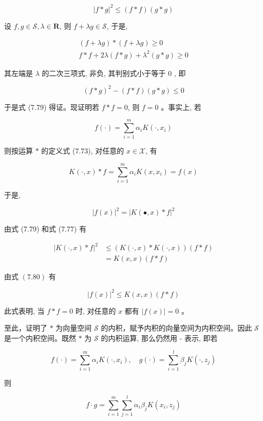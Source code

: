 \documentclass[10pt]{article}
\begin{document}
\begin{equation*}
|f * g|^{2} \leqslant(f * f)(g * g) \tag{7.79}
\end{equation*}


设 $f, g \in \mathcal{S}, \lambda \in \boldsymbol{R}$, 则 $f+\lambda g \in \mathcal{S}$, 于是,

$$
\begin{gathered}
(f+\lambda g) *(f+\lambda g) \geqslant 0 \\
f * f+2 \lambda(f * g)+\lambda^{2}(g * g) \geqslant 0
\end{gathered}
$$

其左端是 $\lambda$ 的二次三项式, 非负, 其判别式小于等于 0 , 即

$$
(f * g)^{2}-(f * f)(g * g) \leqslant 0
$$

于是式 (7.79) 得证。现证明若 $f * f=0$, 则 $f=0$ 。事实上, 若

$$
f(\cdot)=\sum_{i=1}^{m} \alpha_{i} K\left(\cdot, x_{i}\right)
$$

则按运算 $*$ 的定义式 (7.73), 对任意的 $x \in \mathcal{X}$, 有

$$
K(\cdot, x) * f=\sum_{i=1}^{m} \alpha_{i} K\left(x, x_{i}\right)=f(x)
$$

于是,


\begin{equation*}
|f(x)|^{2}=|K(\bullet, x) * f|^{2} \tag{7.80}
\end{equation*}


由式 (7.79) 和式 (7.77) 有

$$
\begin{aligned}
|K(\cdot, x) * f|^{2} & \leqslant(K(\cdot, x) * K(\cdot, x))(f * f) \\
& =K(x, x)(f * f)
\end{aligned}
$$

由式 $(7.80)$ 有

$$
|f(x)|^{2} \leqslant K(x, x)(f * f)
$$

此式表明, 当 $f * f=0$ 时, 对任意的 $x$ 都有 $|f(x)|=0$ 。

至此，证明了 $*$ 为向量空间 $\mathcal{S}$ 的内积，赋予内积的向量空间为内积空间。因此 $\mathcal{S}$ 是一个内积空间。既然 $*$ 为 $\mathcal{S}$ 的内积运算, 那么仍然用 - 表示, 即若

$$
f(\cdot)=\sum_{i=1}^{m} \alpha_{i} K\left(\cdot, x_{i}\right), \quad g(\cdot)=\sum_{i=1}^{l} \beta_{j} K\left(\cdot, z_{j}\right)
$$

则


\begin{equation*}
f \cdot g=\sum_{i=1}^{m} \sum_{j=1}^{l} \alpha_{i} \beta_{j} K\left(x_{i}, z_{j}\right) \tag{7.81}
\end{equation*}
\end{document}
